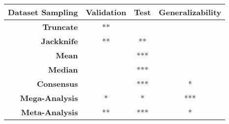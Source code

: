 \begin{tabular}{rccc}
\textbf{Dataset Sampling}  & \textbf{Validation} &      \textbf{Test} & \textbf{Generalizability} \\
\hline
\textbf{Truncate}          &    {\color{red} **} &                    &                           \\
\textbf{Jackknife}         &    {\color{red} **} &                 ** &                           \\
\textbf{Mean}              &                     &                *** &                           \\
\textbf{Median}            &                     &                *** &                           \\
\textbf{Consensus}         &                     &                *** &                         * \\
\textbf{Mega-Analysis}     &     {\color{red} *} &                  * &                       *** \\
\textbf{Meta-Analysis}     &                  ** &                *** &                         * \\
\end{tabular}
